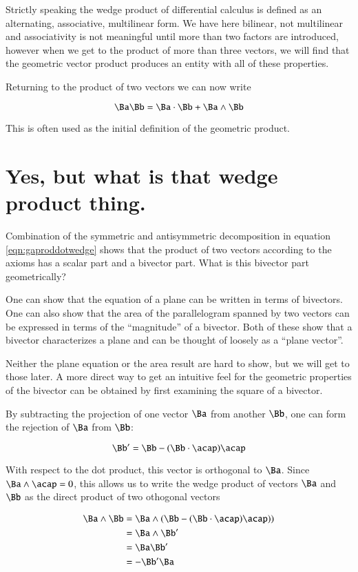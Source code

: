 \documentclass{article}      %
\begin{document}
Strictly speaking the 
wedge product of differential calculus is defined as an alternating, associative, multilinear form.  We have here bilinear, not multilinear and associativity is
not meaningful until more than two factors are introduced, however when we get to the product of more than three
vectors, we will find that the geometric vector product produces an entity with all of these properties.

Returning to the product of two vectors we can now write

\begin{equation}\label{eqn:gaproddotwedge}
\Ba \Bb = \Ba \cdot \Bb + \Ba \wedge \Bb
\end{equation}

This is often used as the initial definition of the geometric product.

\section{ Yes, but what is that wedge product thing. }

Combination of the symmetric and antisymmetric decomposition in equation \ref{eqn:gaproddotwedge} shows that the product of two vectors according to the axioms
has a scalar part and a bivector part.  What is this bivector part geometrically?

One can show that the equation of a plane can be written in terms of bivectors.  One can also show that
the area of the parallelogram spanned by two vectors can be expressed in terms of the ``magnitude'' of a bivector.  Both of these
show that a bivector characterizes a plane and can be thought of loosely as a ``plane vector''.

Neither the plane equation or the area result are hard to show, but we will get to those later.  A more direct way to get an
intuitive feel for the geometric properties of the bivector can be obtained by first examining the
square of a bivector.

By subtracting the projection of one vector $\Ba$ from another $\Bb$, one can form the rejection of $\Ba$ from $\Bb$:

\[
\Bb' = \Bb - (\Bb \cdot \acap)\acap
\]

With respect to the dot product, this vector is orthogonal to $\Ba$.  Since $\Ba \wedge \acap = 0$, this allows us to 
write the wedge product of vectors $\Ba$ and $\Bb$ as the direct product of two othogonal vectors

\begin{align*}
\Ba \wedge \Bb 
&= \Ba \wedge (\Bb - (\Bb \cdot \acap)\acap)) \\
&= \Ba \wedge \Bb' \\
&= \Ba \Bb' \\
&= -\Bb' \Ba \\
\end{align*}
\end{document}
